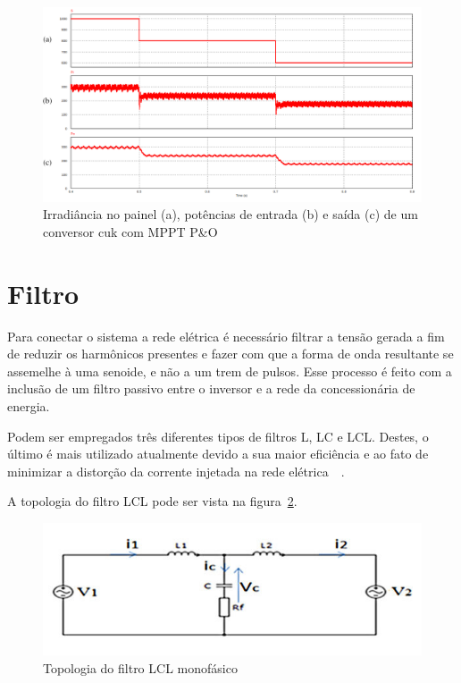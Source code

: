 \documentclass[
	12pt,				%
	openright,			%
	twoside,			%
	a4paper,			%
	english,			%
	french,				%
	spanish,			%
	brazil,				%
	]{abntex2}
\begin{document}
\begin{figure}[H]
	\captionsetup{justification=centering}
	\centering
		\includegraphics[width= \linewidth]{mppt_power_demo}
		\caption{Irradiância no painel (a), potências de entrada (b) e saída (c) de um conversor cuk com MPPT P\&O}
		\label{fig:mppt_power_demo}
\end{figure}

\section{Filtro}

Para conectar o sistema a rede elétrica é necessário filtrar a tensão gerada a fim de reduzir os harmônicos presentes e fazer com que a forma de onda resultante se assemelhe à uma senoide, e não a um trem de pulsos. Esse processo é feito com a inclusão de um filtro passivo entre o inversor e a rede da concessionária de energia.

Podem ser empregados três diferentes tipos de filtros L, LC e LCL. Destes, o último é mais utilizado atualmente devido a sua maior eficiência e ao fato de minimizar a distorção da corrente injetada na rede elétrica~\cite{LCL_FILTER}~\cite{LCL_FILTER_Reznik}.

A topologia do filtro LCL pode ser vista na figura~\ref{fig:lcl_filt_top}.

\begin{figure}[htbp]%
	\centering
		\includegraphics[width=0.7 \linewidth]{lcl_filt_top}
		\caption{Topologia do filtro LCL monofásico~\cite{LCL_FILTER}}
		\label{fig:lcl_filt_top}
\end{figure}
\end{document}

